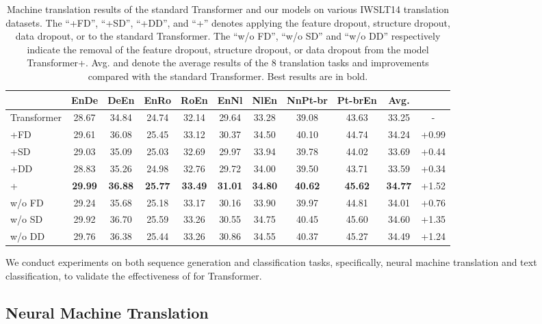 \documentclass[11pt]{article}
\begin{document}
\begin{table*}[!htbp]
    \centering
	\resizebox{1.0\textwidth}{!}
	{
		\centering
		\begin{tabular}{l | c c c c c c c c| c c}
			\hline
            & EnDe & DeEn & EnRo & RoEn & EnNl & NlEn & NnPt-br & Pt-brEn & Avg. &  \\
			\hline
			Transformer & 28.67 & 34.84 & 24.74 & 32.14 & 29.64 & 33.28 & 39.08 & 43.63 & 33.25 & -\\
			\hline
			+FD & 29.61 & 36.08 & 25.45 & 33.12 & 30.37 & 34.50 & 40.10 & 44.74 & 34.24 & +0.99\\
			+SD & 29.03 & 35.09 & 25.03 & 32.69 & 29.97 & 33.94 & 39.78 & 44.02 & 33.69 & +0.44\\
			+DD & 28.83 & 35.26 & 24.98 & 32.76 & 29.72 & 34.00 & 39.50 & 43.71 & 33.59 & +0.34\\
			\hline
			+ & \textbf{29.99} & \textbf{36.88} & \textbf{25.77} & \textbf{33.49} & \textbf{31.01} & \textbf{34.80} & \textbf{40.62} & \textbf{45.62} & \textbf{34.77} & +1.52\\
			\hline
			w/o FD & 29.24 & 35.68 & 25.18 & 33.17 & 30.16& 33.90 & 39.97 & 44.81 & 34.01 & +0.76\\
			w/o SD & 29.92 & 36.70 & 25.59 & 33.26 & 30.55 & 34.75 & 40.45 & 45.60 & 34.60 & +1.35 \\
			w/o DD & 29.76 & 36.38 & 25.44 & 33.26 & 30.86 & 34.55 & 40.37 & 45.27 & 34.49 & +1.24\\
			\hline
	\end{tabular} }
	\caption{Machine translation results of the standard Transformer and our models on various IWSLT14 translation datasets. The ``+FD'', ``+SD'', ``+DD'', and ``+'' denotes applying the feature dropout, structure dropout, data dropout, or  to the standard Transformer. The ``w/o FD'', ``w/o SD'' and ``w/o DD'' respectively indicate the removal of the feature dropout, structure dropout, or data dropout from the model Transformer+. Avg. and  denote the average results of the 8 translation tasks and improvements compared with the standard Transformer. Best results are in bold.} 
	\label{mt_mainresults}
\end{table*}

We conduct experiments on both sequence generation and classification tasks, specifically, neural machine translation and text classification, to validate the effectiveness of  for Transformer.

\subsection{Neural Machine Translation}
\end{document}
